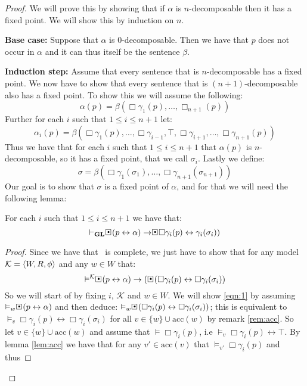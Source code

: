 \documentclass[../main.tex]{subfiles}
\begin{document}
\begin{proof}
	We will prove this by showing that if $\alpha$ is $n$-decomposable
	then it has a fixed point. We will show this by induction on $n$.

	\textbf{Base case:} Suppose that $\alpha$ is $0$-decomposable. Then we
	have that $p$ does not occur in $\alpha$ and it can thus itself be the
	sentence $\beta$.

	\textbf{Induction step:}
	Assume that every sentence that is $n$-decomposable has a fixed point.
	We now have to show that every sentence that is $(n+1)$-decomposable
	also has a fixed point. To show this we will assume the following:
	\[\alpha(p)=\beta(\Box\gamma_1(p),\ldots,\Box_{n+1}(p))\]
	Further for each $i$ such that $1\leq i\leq n+1$ let:
	\[\alpha_i(p)=\beta(\Box\gamma_1(p),\ldots,\Box\gamma_{i-1},\top,\Box\gamma_{i+1},\ldots,\Box\gamma_{n+1}(p))\]
	Thus we have that for each $i$ such that $1\leq i\leq n+1$ that $\alpha(p)$ is $n$-decomposable,
	so it has a fixed point, that we call $\sigma_i$. Lastly we define:
	\[\sigma=\beta(\Box\gamma_1(\sigma_1),\ldots,\Box\gamma_{n+1}(\sigma_{n+1}))\]
	Our goal is to show that $\sigma$ is a fixed point of $\alpha$, and for
	that we will need the following lemma:
	\begin{lem}
		\label{lem:fix}
		For each $i$ such that $1\leq i\leq n+1$ we have that:
		$$\vdash_\GL\sBox(p\leftrightarrow\alpha)\rightarrow\sBox\Box\gamma_i(p)\leftrightarrow\gamma_i(\sigma_i))$$
	\end{lem}
	\begin{proof}
		Since we have that \GL\ is complete, we just have to show that
		for any model $\mathcal{K}=\langle W,R,\phi\rangle$ and any $w\in W$
		that:
		\begin{equation}
		\label{eqn:1}
		\vDash^\mathcal{K}\sBox(p\leftrightarrow\alpha)\rightarrow(\sBox(\Box\gamma_i(p)\leftrightarrow
		\Box\gamma_i(\sigma_i))
	\end{equation}
		So we will start of by fixing $i$, $\mathcal{K}$ and $w\in W$.
		We will show \ref{eqn:1} by assuming
		$\vDash_w\sBox(p\leftrightarrow\alpha)$ and then deduce:
		$\vDash_w\sBox(\Box\gamma_i(p)\leftrightarrow\Box\gamma_i(\sigma_i))$;
		this is equivalent to $\vDash_v\Box
		\gamma_i(p)\leftrightarrow\Box\gamma_i(\sigma_i)$ for all
		$v\in\{w\}\cup\text{acc}(w)$ by remark \ref{rem:acc}. So let
		$v\in\{w\}\cup\text{acc}(w)$ and assume that
		$\vDash\Box\gamma_i(p)$, i.e
		$\vDash_v\Box\gamma_i(p)\leftrightarrow\top$. By lemma
		\ref{lem:acc} we have that for any $v'\in\text{acc}(v)$ that
		$\vDash_{v'}\Box\gamma_i(p)$ and thus

\end{proof}
\end{proof}
\end{document}
